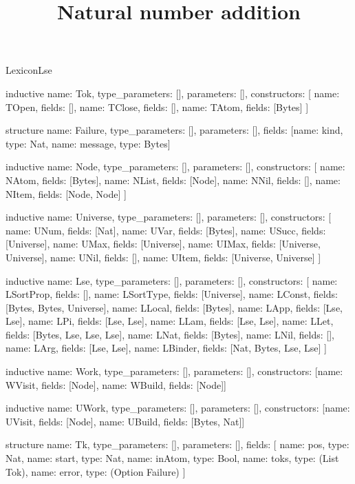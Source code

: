 \begin{lexlean}{LexiconLse}
\title{Natural number addition}
\begin{semanticmodule}
inductive{
  name: Tok,
  type_parameters: [],
  parameters: [],
  constructors: [
    {name: TOpen, fields: []},
    {name: TClose, fields: []},
    {name: TAtom, fields: [Bytes]}
  ]
}

structure{
  name: Failure,
  type_parameters: [],
  parameters: [],
  fields: [{name: kind, type: Nat}, {name: message, type: Bytes}]
}

inductive{
  name: Node,
  type_parameters: [],
  parameters: [],
  constructors: [
    {name: NAtom, fields: [Bytes]},
    {name: NList, fields: [Node]},
    {name: NNil, fields: []},
    {name: NItem, fields: [Node, Node]}
  ]
}

inductive{
  name: Universe,
  type_parameters: [],
  parameters: [],
  constructors: [
    {name: UNum, fields: [Nat]},
    {name: UVar, fields: [Bytes]},
    {name: USucc, fields: [Universe]},
    {name: UMax, fields: [Universe]},
    {name: UIMax, fields: [Universe, Universe]},
    {name: UNil, fields: []},
    {name: UItem, fields: [Universe, Universe]}
  ]
}

inductive{
  name: Lse,
  type_parameters: [],
  parameters: [],
  constructors: [
    {name: LSortProp, fields: []},
    {name: LSortType, fields: [Universe]},
    {name: LConst, fields: [Bytes, Bytes, Universe]},
    {name: LLocal, fields: [Bytes]},
    {name: LApp, fields: [Lse, Lse]},
    {name: LPi, fields: [Lse, Lse]},
    {name: LLam, fields: [Lse, Lse]},
    {name: LLet, fields: [Bytes, Lse, Lse, Lse]},
    {name: LNat, fields: [Bytes]},
    {name: LNil, fields: []},
    {name: LArg, fields: [Lse, Lse]},
    {name: LBinder, fields: [Nat, Bytes, Lse, Lse]}
  ]
}

inductive{
  name: Work,
  type_parameters: [],
  parameters: [],
  constructors: [{name: WVisit, fields: [Node]}, {name: WBuild, fields: [Node]}]
}

inductive{
  name: UWork,
  type_parameters: [],
  parameters: [],
  constructors: [{name: UVisit, fields: [Node]}, {name: UBuild, fields: [Bytes, Nat]}]
}

structure{
  name: Tk,
  type_parameters: [],
  parameters: [],
  fields: [
    {name: pos, type: Nat},
    {name: start, type: Nat},
    {name: inAtom, type: Bool},
    {name: toks, type: (List Tok)},
    {name: error, type: (Option Failure)}
  ]
}


\end{semanticmodule}
\end{lexlean}
